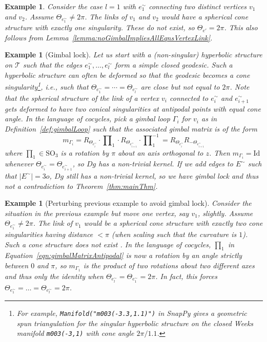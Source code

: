 \documentclass[utopia,fullpage]{nmd/article}
\newcommand{\negSpace}{\!}
\newtheorem{example}[theorem]{Example}
\newcommand{\negSpace}{}
\newcommand\mySO[1]{\mathrm{SO}_{#1}}
\newcommand\trig{\mathcal{T}}
\begin{document}
\begin{example} \label{example:singleEdgeViolation} Consider the case $l=1$ with $e^\sim_1$ connecting two distinct vertices $v_1$ and $v_2$. Assume $\Theta_{e^\sim_1}\not=2\pi$. The links of $v_1$ and $v_2$ would have a spherical cone structure with exactly one singularity. These do not exist, so $\Theta_{e'}=2\pi$. This also follows from Lemma~\ref{lemma:noGimbalImpliesAllEqnsVertexLink}.
\end{example}

\begin{example}[Gimbal lock]\label{ex:gimbalLockGeodesic} Let us start with a (non-singular) hyperbolic structure on $\trig$\negSpace{} such that the edges $e^\sim_1,\dots, e^\sim_l$ form a simple closed geodesic. Such a hyperbolic structure can often be deformed so that the geodesic becomes a cone singularity\footnote{For example, \texttt{Manifold("m003(-3.3,1.1)")} in SnapPy gives a geometric spun triangulation for the singular hyperbolic structure on the closed Weeks manifold \texttt{m003(-3,1)} with cone angle $2\pi/1.1$.}, i.e., such that $\Theta_{e^\sim_1}=\cdots=\Theta_{e^\sim_l}$ are close but not equal to $2\pi$. Note that the spherical structure of the link of a vertex $v_i$ connected to $e^\sim_i$ and $e^\sim_{i+1}$ gets deformed to have two conical singularities at antipodal points with equal cone angle. In the language of cocycles, pick a gimbal loop $\Gamma_i$ for $v_i$ as in Definition~\ref{def:gimbalLoop} such that the associated gimbal matrix is of the form 
\begin{equation} \label{eqn:gimbalMatrixAntipodal}
m_{\Gamma_i}=R_{\Theta_{e^\sim_i}}\cdot \prod\nolimits_1 \cdot R_{\Theta_{e^\sim_{i+1}}}\cdot \prod\nolimits_1^{-1} = R_{\Theta_{e^\sim_i}} R_{-\Theta_{e^\sim_{i+1}}}
\end{equation}
where $\prod_1\in\mySO{3}$ is a rotation by $\pi$ about an axis orthogonal to $z$. Then $m_{\Gamma_i}=\mathrm{Id}$ whenever $\Theta_{e^\sim_i}=\Theta_{e^\sim_{i+1}}$, so $Dg$ has a non-trivial kernel. If we add edges to $E^\sim$ such that $|E^\sim|=3o$, $Dg$ still has a non-trivial kernel, so we have gimbal lock and thus not a contradiction to Theorem~\ref{thm:mainThm}.
\end{example}

\begin{example}[Perturbing previous example to avoid gimbal lock] \label{ex:avoidGimbalLockGeodesic}
Consider the situation in the previous example but move one vertex, say $v_1$, slightly. Assume $\Theta_{e^\sim_1}\not=2\pi$. The link of $v_1$ would be a spherical cone structure with exactly two cone singularities having distance $<\pi$ (when scaling such that the curvature is $1$). Such a cone structure does not exist \cite[Corollary~3.5]{mondelloPanov}. In the language of cocycles, $\prod_1$ in Equation~\ref{eqn:gimbalMatrixAntipodal} is now a rotation by an angle strictly between $0$ and $\pi$, so $m_{\Gamma_1}$ is the product of two rotations about two different axes and thus only the identity when $\Theta_{e^\sim_l}=\Theta_{e^\sim_{1}}=2\pi$. In fact, this forces $\Theta_{e^\sim_1}=\dots=\Theta_{e^\sim_l}=2\pi$.  
\end{example}
\end{document}
